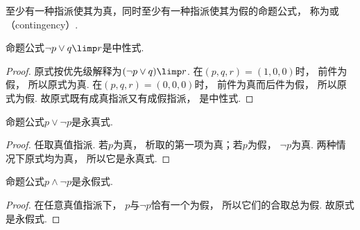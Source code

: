 \begin{definition}
至少有一种指派使其为真，同时至少有一种指派使其为假的命题公式，
称为或（contingency）.
\end{definition}

\begin{example}
命题公式\(\neg p \lor q \limp r\)是中性式.
    \begin{proof}
        原式按优先级解释为\((\neg p\lor q)\limp r\).
        在\((p,q,r)=(1,0,0)\)时，
        前件为假，
        所以原式为真.
        在\((p,q,r)=(0,0,0)\)时，
        前件为真而后件为假，
        所以原式为假.
        故原式既有成真指派又有成假指派，
        是中性式.
    \end{proof}
\end{example}

\begin{example}
命题公式\(p \lor \neg p\)是永真式.
    \begin{proof}
        任取真值指派.
        若\(p\)为真，
        析取的第一项为真；若\(p\)为假，
        \(\neg p\)为真.
        两种情况下原式均为真，
        所以它是永真式.
    \end{proof}
\end{example}

\begin{example}
命题公式\(p \land \neg p\)是永假式.
    \begin{proof}
        在任意真值指派下，
        \(p\)与\(\neg p\)恰有一个为假，
        所以它们的合取总为假.
        故原式是永假式.
    \end{proof}
\end{example}

